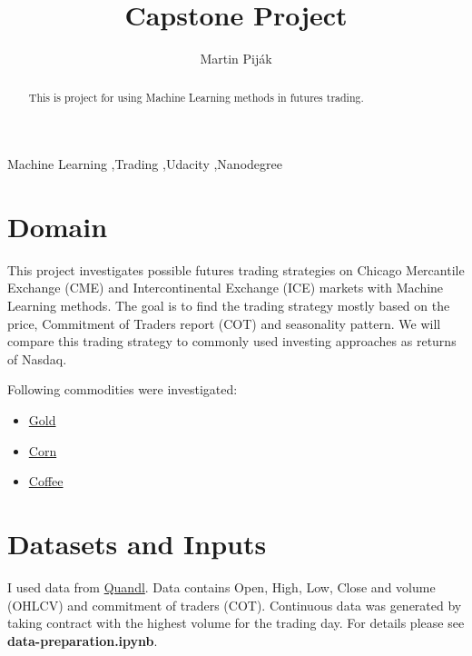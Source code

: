 \documentclass[final,2p]{elsarticle}
\begin{document}
\begin{frontmatter}

\title{Capstone Project}

\author{Martin Pij{\'a}k}

\address{Bratislava, Slovakia}

\begin{abstract}
This is project for using Machine Learning methods in futures trading.
\end{abstract}

\begin{keyword}
Machine Learning \sep{Trading} \sep{Udacity} \sep{Nanodegree}

\end{keyword}

\end{frontmatter}


\section{Domain}

This project investigates possible futures trading strategies on Chicago Mercantile Exchange (CME) and Intercontinental Exchange (ICE) markets with Machine Learning methods. The goal is to find the trading strategy mostly based on the price, Commitment of Traders report (COT) and seasonality pattern. We will compare this trading strategy to commonly used investing approaches as returns of Nasdaq.

Following commodities were investigated:
\begin{itemize}
    \item \href{https://www.cmegroup.com/trading/metals/precious/gold.html}{Gold}
    \item \href{https://www.cmegroup.com/trading/agricultural/grain-and-oilseed/corn.html}{Corn}
    \item \href{https://www.cmegroup.com/trading/agricultural/softs/coffee.html}{Coffee}
\end{itemize}
\clearpage
\section{Datasets and Inputs}

I used data from \href{https://www.quandl.com/}{Quandl}. Data contains Open, High, Low, Close and volume (OHLCV) and commitment of traders (COT).
Continuous data was generated by taking contract with the highest volume for the trading day. For details please see \textbf{data-preparation.ipynb}.
\end{document}
